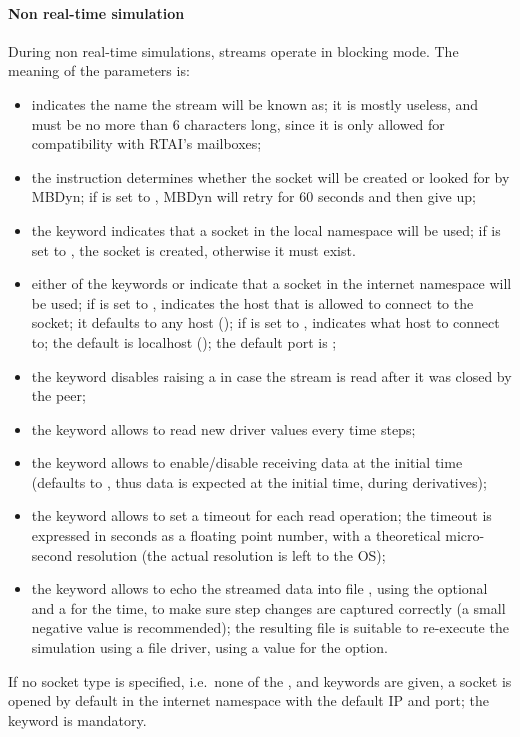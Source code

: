 \paragraph{Non real-time simulation}
During non real-time simulations, streams operate in blocking mode.
The meaning of the parameters is:
\begin{itemize}
\item {} indicates the name the stream will be known as;
it is mostly useless, and must be no more than 6 characters long,
since it is only allowed for compatibility with RTAI's mailboxes;
\item the instruction  determines whether the socket will be
created or looked for by MBDyn; if  is set to ,
MBDyn will retry for 60 seconds and then give up;
\item the keyword  indicates that a socket 
in the local namespace will be used; if  is set to ,
the socket is created, otherwise it must exist.
\item either of the keywords  or  indicate that a socket
in the internet namespace will be used;
if  is set to ,  indicates 
the host that is allowed to connect to the socket; it defaults 
to any host (); if  is set to ,
 indicates what host to connect to; the default 
is localhost (); the default port is ;
\item the keyword  disables raising a 
in case the stream is read after it was closed by the peer;
\item the keyword  allows to read new driver values
every  time steps;
\item the keyword  allows to enable/disable
receiving data at the initial time (defaults to ,
thus data is expected at the initial time, during derivatives);
\item the keyword  allows to set a timeout
for each read operation; the timeout is expressed in seconds
as a floating point number, with a theoretical micro-second resolution
(the actual resolution is left to the OS);
\item the keyword  allows to echo the streamed data
into file , using the optional 
and a  for the time, to make sure step changes are captured
correctly (a small negative value is recommended);
the resulting file is suitable to re-execute the simulation
using a  file driver, using a  value
for the  option.
\end{itemize}
If no socket type is specified, i.e.\ none of the ,  
and  keywords are given, a socket is opened by default 
in the internet namespace with the default IP and port; the 
keyword is mandatory.

